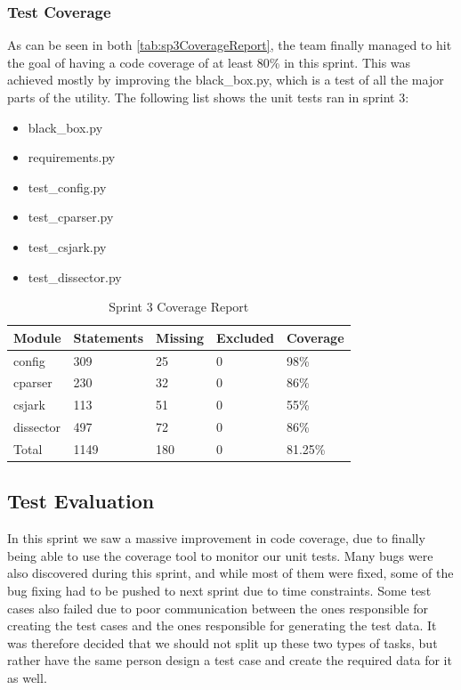 \subsubsection{Test Coverage}
As can be seen in both \autoref{tab:sp3CoverageReport}, the team finally managed to hit the goal of having a code coverage of at least 80\% in this sprint. This was achieved mostly by improving the black\_box.py, which is a test of all the major parts of the \gls{utility}. The following list shows the unit tests ran in sprint 3:

\begin{itemize}
	\item black\_box.py
	\item requirements.py
	\item test\_config.py
	\item test\_cparser.py
	\item test\_csjark.py
	\item test\_dissector.py
\end{itemize}

\begin{table}[!htb]\footnotesize\center
	\caption{Sprint 3 Coverage Report\label{tab:sp3CoverageReport}}
	\begin{tabular}{l l l l l}
		\toprule
		Module & Statements & Missing & Excluded & Coverage\\
		\midrule
		config & 309 & 25 & 0 & 98\%\ \\
		cparser & 230 & 32 & 0 & 86\%\ \\
		csjark & 113 & 51 & 0 & 55\%\ \\
		dissector & 497 & 72 & 0 & 86\%\ \\
		Total & 1149 & 180  & 0 & 81.25\%\ \\
		\bottomrule
	\end{tabular}
\end{table}

\subsection{Test Evaluation}
In this sprint we saw a massive improvement in code coverage, due to finally being able to use the coverage tool to monitor our unit tests. Many bugs were also discovered during this sprint, and while most of them were fixed, some of the bug fixing had to be pushed to next sprint due to time constraints. Some test cases also failed due to poor communication between the ones responsible for creating the test cases and the ones responsible for generating the test data. It was therefore decided that we should not split up these two types of tasks, but rather have the same person design a test case and create the required data for it as well.


